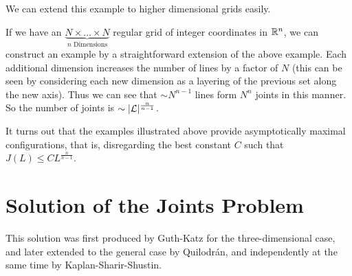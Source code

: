 We can extend this example to higher dimensional grids easily. 
\begin{example}
If we have an $\underbrace{N \times \dots \times N}_{n \text{ Dimensions}}$ regular grid of integer coordinates in $\mathbb R^n$, we can construct an example  by a straightforward extension
of the above example. Each additional dimension increases the number of lines by a factor of $N$ (this can be seen by considering each new dimension as a layering of the previous set along the new axis).
Thus we can see that $\sim N^{n-1}$ lines form $N^n$ joints in this manner. So the number of joints is $\sim |\mathcal L|^{\frac{n}{n-1}}$.
\end{example}

It turns out that the examples illustrated above provide asymptotically maximal configurations, that is, disregarding the best constant $C$ such that $J(L) \leq CL^{\frac{n}{n-1}}$.
\section{Solution of the Joints Problem}
This solution was first produced by Guth-Katz for the three-dimensional case,\cite{guth2008algebraic} and later extended to the general case by Quilodrán,\cite{quilodran2009joints} and independently at the same time by 
Kaplan-Sharir-Shustin.\cite{kaplan2009lines} 


